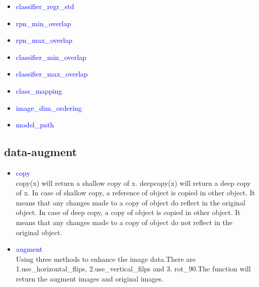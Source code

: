 \documentclass[UTF8,a4paper,11pt]{ctexart}
\begin{document}
\begin{itemize}
            \item {\textcolor{blue}{classifier\_regr\_std}} \\
            \item {\textcolor{blue}{rpn\_min\_overlap}} \\
            \item {\textcolor{blue}{rpn\_max\_overlap}} \\
            \item {\textcolor{blue}{classifier\_min\_overlap}} \\
            \item {\textcolor{blue}{classifier\_max\_overlap}} \\
            \item {\textcolor{blue}{class\_mapping}} \\
            \item {\textcolor{blue}{image\_dim\_ordering}} \\
            \item {\textcolor{blue}{model\_path}} \\    
        \end{itemize}
    \subsection{data-augment}
        \begin{itemize}
            \item {\textcolor{blue}{copy}} \\
            copy(x) will return a shallow copy of x. deepcopy(x) will return a deep copy of x. In case of shallow copy, a reference of object is copied in other object. It means that any changes made to a copy of object do reflect in the original object. In case of deep copy, a copy of object is copied in other object. It means that any changes made to a copy of object do not reflect in the original object.
            \item {\textcolor{blue}{augment}} \\
            Using three methods to enhance the image data.There are 1.use\_horizontal\_flips, 2.use\_vertical\_filps and 3. rot\_90.The function will return the augment images and original images.
        \end{itemize}
\end{document}
